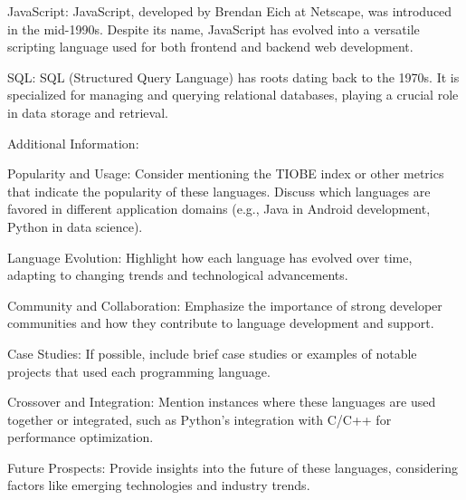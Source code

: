     JavaScript:
        JavaScript, developed by Brendan Eich at Netscape, was introduced in the mid-1990s.
        Despite its name, JavaScript has evolved into a versatile scripting language used for both frontend and backend web development.

    SQL:
        SQL (Structured Query Language) has roots dating back to the 1970s.
        It is specialized for managing and querying relational databases, playing a crucial role in data storage and retrieval.

Additional Information:

    Popularity and Usage:
        Consider mentioning the TIOBE index or other metrics that indicate the popularity of these languages.
        Discuss which languages are favored in different application domains (e.g., Java in Android development, Python in data science).

    Language Evolution:
        Highlight how each language has evolved over time, adapting to changing trends and technological advancements.

    Community and Collaboration:
        Emphasize the importance of strong developer communities and how they contribute to language development and support.

    Case Studies:
        If possible, include brief case studies or examples of notable projects that used each programming language.

    Crossover and Integration:
        Mention instances where these languages are used together or integrated, such as Python's integration with C/C++ for performance optimization.

    Future Prospects:
        Provide insights into the future of these languages, considering factors like emerging technologies and industry trends.
